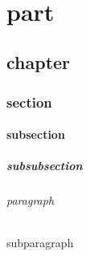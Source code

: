 \tiny
\scriptsize
\footnotesize
\small
\normalsize
\large
\Large
\LARGE
\huge
\Huge 

\quad  %
\!     %
\,     %
\:     %
\;     %
\      %
\qquad %

\part{part}
\chapter{chapter}
\section{section}
\subsection{subsection}
\subsubsection{subsubsection}
\paragraph{paragraph}
\subparagraph{subparagraph}
